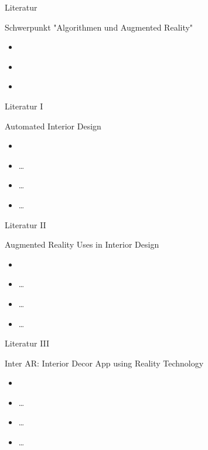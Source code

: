 \documentclass[presentation,bigger,aspectratio=169]{beamer}
\begin{document}
\begin{frame}[label={sec:org12dcae6}]{Literatur}
\begin{block}{Schwerpunkt "Algorithmen und Augmented Reality"}
\begin{itemize}
\item \textcite{kanAutomatedInteriorDesign2017}
\item \textcite{sanduAugmentedRealityUses2018}
\item \textcite{moaresInterARInterior2020}
\end{itemize}
\end{block}
\end{frame}

\begin{frame}[label={sec:org90c3664}]{Literatur I}
\begin{block}{Automated Interior Design}
\begin{itemize}
\item \textcite{kanAutomatedInteriorDesign2017}
\item \ldots{}
\item \ldots{}
\item \ldots{}
\end{itemize}
\end{block}
\end{frame}

\begin{frame}[label={sec:orge24ad13}]{Literatur II}
\begin{block}{Augmented Reality Uses in Interior Design}
\begin{itemize}
\item \textcite{sanduAugmentedRealityUses2018}
\item \ldots{}
\item \ldots{}
\item \ldots{}
\end{itemize}
\end{block}
\end{frame}

\begin{frame}[label={sec:org9de1b3f}]{Literatur III}
\begin{block}{Inter AR: Interior Decor App using Reality Technology}
\begin{itemize}
\item \textcite{moaresInterARInterior2020}
\item \ldots{}
\item \ldots{}
\item \ldots{}
\end{itemize}
\end{block}
\end{frame}
\end{document}
